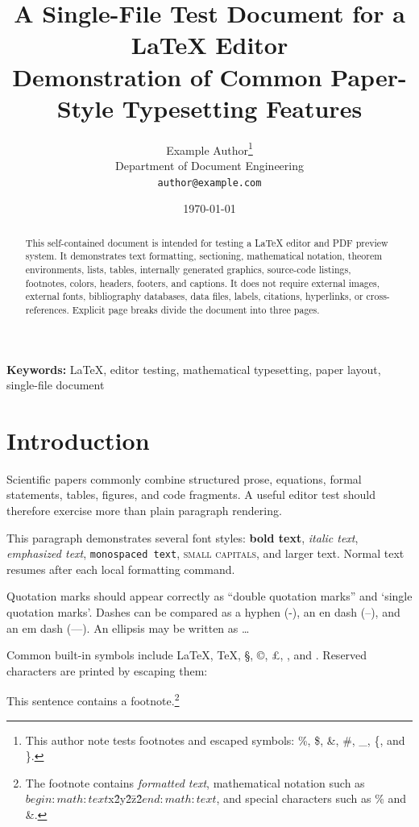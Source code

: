\documentclass[10pt,a4paper,twocolumn]{article}
\title{
  \textbf{A Single-File Test Document for a \LaTeX{} Editor}\\
  \large Demonstration of Common Paper-Style Typesetting Features
}
\author{
  Example Author\thanks{
    This author note tests footnotes and escaped symbols:
    \%, \$, \&, \#, \_, \{, and \}.
  }\\
  Department of Document Engineering\\
  \texttt{author@example.com}
}
\date{\today}
\theoremstyle{definition}
\theoremstyle{remark}
\begin{document}

\maketitle

\begin{abstract}
This self-contained document is intended for testing a \LaTeX{}
editor and PDF preview system. It demonstrates text formatting,
sectioning, mathematical notation, theorem environments, lists,
tables, internally generated graphics, source-code listings,
footnotes, colors, headers, footers, and captions. It does not
require external images, external fonts, bibliography databases,
data files, labels, citations, hyperlinks, or cross-references.
Explicit page breaks divide the document into three pages.
\end{abstract}

\noindent
\textbf{Keywords:}
\LaTeX, editor testing, mathematical typesetting, paper layout,
single-file document

\section{Introduction}

Scientific papers commonly combine structured prose, equations,
formal statements, tables, figures, and code fragments. A useful
editor test should therefore exercise more than plain paragraph
rendering.

This paragraph demonstrates several font styles:
\textbf{bold text},
\textit{italic text},
\emph{emphasized text},
\texttt{monospaced text},
\textsc{small capitals},
and {\large larger text}.
Normal text resumes after each local formatting command.

Quotation marks should appear correctly as
``double quotation marks'' and `single quotation marks'.
Dashes can be compared as a hyphen (-), an en dash (--), and an
em dash (---). An ellipsis may be written as \ldots

Common built-in symbols include
\LaTeX{},
\TeX{},
\S,
\copyright,
\pounds,
\dag,
and
\ddag.
Reserved characters are printed by escaping them:


This sentence contains a footnote.\footnote{
The footnote contains \textit{formatted text}, mathematical notation
such as $begin:math:text$x\^2\+y\^2\=z\^2$end:math:text$, and special characters such as \% and \&.
}
\end{document}
